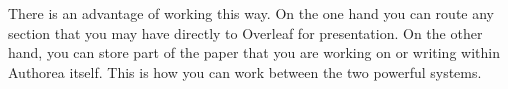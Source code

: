 There is an advantage of working this way. On the one hand you can route any section that you may have directly to Overleaf for presentation. On the other hand, you can store part of the paper that you are working on or writing within Authorea itself. This is how you can work between the two powerful systems. 

